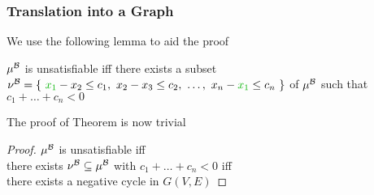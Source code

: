 \begin{frame}
  \frametitle{Translation into a Graph}

  We use the following lemma to aid the proof

  \begin{lemma}
    $\mu^{\mathcal{B}}$ is unsatisfiable iff there exists a subset 
    $\babst{\nu} = \{\ \coltwo{x_1} - x_2 \leq c_1,\ x_2 - x_3 \leq c_2,\ \ldots,\ x_n - \coltwo{x_1} \leq c_n\ \}$ of $\mu^{\mathcal{B}}$
    such that $c_1 + \ldots + c_n < 0$
  \end{lemma}
  \pause
  \vfill
  The proof of Theorem is now trivial
  \begin{proof}
  $\mu^{\mathcal{B}}$ is unsatisfiable iff  \\
  there exists $\nu^{\mathcal{B}} \subseteq \mu^{\mathcal{B}}$ with $c_1 + \ldots + c_n < 0$ iff  \\
  there exists a negative cycle in $G(V,E)$
  \end{proof}

\end{frame}
